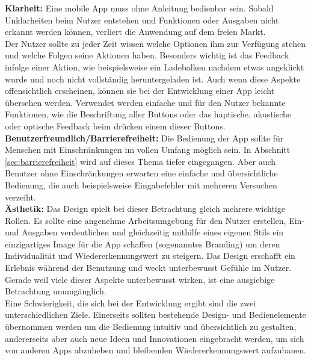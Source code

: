 \noindent
{}
\textbf{Klarheit:} Eine mobile App muss ohne Anleitung bedienbar sein. Sobald Unklarheiten beim Nutzer  entstehen und Funktionen oder Ausgaben nicht erkannt werden können, verliert die Anwendung auf dem freien Markt. \\
Der Nutzer sollte zu jeder Zeit wissen welche Optionen ihm zur Verfügung stehen und welche Folgen seine Aktionen haben. Besonders wichtig ist das Feedback infolge einer Aktion, wie beispielsweise ein Ladebalken nachdem etwas angeklickt wurde und noch nicht vollständig heruntergeladen ist. Auch wenn diese Aspekte offensichtlich erscheinen, können sie bei der Entwicklung einer App leicht übersehen werden. Verwendet werden einfache und für den Nutzer bekannte Funktionen, wie die Beschriftung aller Buttons oder das haptische, akustische oder optische Feedback beim drücken einem dieser Buttons.\\

\noindent
{}
\textbf{Benutzerfreundlich/Barrierefreiheit:} Die Bedienung der App sollte für Menschen mit Einschränkungen im vollen Umfang möglich sein. In Abschnitt \ref{sec:barrierefreiheit} wird auf dieses Thema tiefer eingegangen. Aber auch Benutzer ohne Einschränkungen erwarten eine einfache und übersichtliche Bedienung, die auch beispielsweise  Eingabefehler mit mehreren Versuchen verzeiht.\\

\noindent
{}
\textbf{Ästhetik:} Das Design spielt bei dieser Betrachtung gleich mehrere wichtige Rollen. Es sollte eine angenehme Arbeitsumgebung für den Nutzer erstellen, Ein- und Ausgaben verdeutlichen und gleichzeitig mithilfe eines eigenen Stils ein einzigartiges Image für die App schaffen (sogenanntes Branding) um deren Individualität und Wiedererkennungswert zu steigern. Das Design erschafft ein Erlebnis während der Benutzung und weckt unterbewusst Gefühle im Nutzer. \\

\noindent
Gerade weil viele dieser Aspekte unterbewusst wirken, ist eine ausgiebige Betrachtung unumgänglich.\\
Eine Schwierigkeit, die sich bei der Entwicklung ergibt sind die zwei unterschiedlichen Ziele. Einerseits sollten bestehende Design- und Bedienelemente  übernommen werden um die Bedienung intuitiv und übersichtlich zu gestalten, andererseits aber auch neue Ideen und Innovationen eingebracht werden, um sich von anderen Apps abzuheben und bleibenden Wiedererkennungswert aufzubauen.
